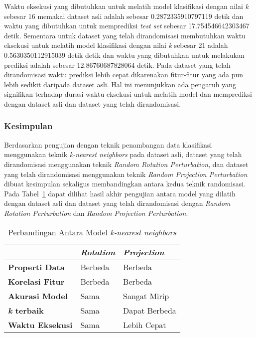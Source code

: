 Waktu eksekusi yang dibutuhkan untuk melatih model klasifikasi dengan nilai \textit{k} sebesar 16 memakai dataset asli adalah sebesar 0.2872335910797119 detik dan waktu yang dibutuhkan untuk memprediksi \textit{test set} sebesar 17.754546642303467 detik. Sementara untuk dataset yang telah dirandomisasi membutuhkan waktu eksekusi untuk melatih model klasifikasi dengan nilai \textit{k} sebesar 21 adalah 0.5630350112915039 detik detik dan waktu yang dibutuhkan untuk melakukan prediksi adalah sebesar 12.86760687828064 detik. Pada dataset yang telah dirandomisasi waktu prediksi lebih cepat dikarenakan fitur-fitur yang ada pun lebih sedikit daripada dataset asli. Hal ini menunjukkan ada pengaruh yang signifikan terhadap durasi waktu eksekusi untuk melatih model dan memprediksi dengan dataset asli dan dataset yang telah dirandomisasi.

\subsubsection{Kesimpulan}
\label{subsubsec:pengujian-klasifikasi-kesimpulan}

Berdasarkan pengujian dengan teknik penambangan data klasifikasi menggunakan teknik \textit{k-nearest neighbors} pada dataset asli, dataset yang telah dirandomisasi menggunakan teknik \textit{Random Rotation Perturbation}, dan dataset yang telah dirandomisasi menggunakan teknik \textit{Random Projection Perturbation} dibuat kesimpulan sekaligus membandingkan antara kedua teknik randomisasi. Pada Tabel~\ref{table:perbandingan-klasifikasi} dapat dilihat hasil akhir pengujian antara model yang dilatih dengan dataset asli dan dataset yang telah dirandomisasi dengan \textit{Random Rotation Perturbation} dan \textit{Random Projection Perturbation}.

\begin{table}
	\centering
	\caption{Perbandingan Antara Model \textit{k-nearest neighbors}}
	\begin{tabular}{|l|l|l|}
		\hline
		& \textbf{\textit{Rotation}} & \textbf{\textit{Projection}} \\ \hline
		\textbf{Properti Data} & Berbeda & Berbeda \\
		\textbf{Korelasi Fitur} & Berbeda & Berbeda \\
		\textbf{Akurasi Model} & Sama & Sangat Mirip \\
		\textbf{\textit{k} terbaik} & Sama & Dapat Berbeda \\
		\textbf{Waktu Eksekusi} & Sama & Lebih Cepat \\
		\hline
	\end{tabular}
	\label{table:perbandingan-klasifikasi}
\end{table}


